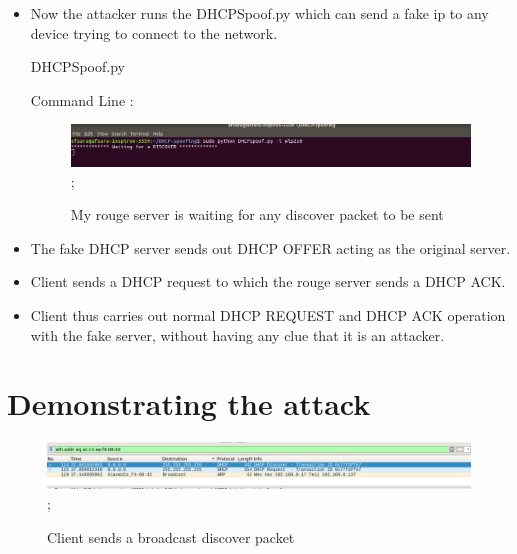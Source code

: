 \documentclass[12pt]{article}
\begin{document}
\begin{sloppypar}
\begin{itemize}
    \item Now the attacker runs the DHCPSpoof.py which can send a fake ip to any device trying to connect to the network.
    
    \newpage
    DHCPSpoof.py
    

    Command Line : 
    

    \begin{figure}[h]
    \centering
    \includegraphics[width=15 cm,height=2 cm]{images/runningDHCPSpoof1.png};
    \caption{My rouge server is waiting for any discover packet to be sent}
    \end{figure}
    
     \item The fake DHCP server sends out DHCP OFFER acting as the original server.
     
     \item Client sends a DHCP request to which the rouge server sends a DHCP ACK.
     
     \item Client thus carries out normal DHCP REQUEST and DHCP ACK operation with the fake server, without having any clue that it is an attacker.
    
    \end{itemize}
    \newpage    
    \section{Demonstrating the attack}

    \begin{figure}[h]
    \centering
    \includegraphics[width=15 cm,height= 3 cm]{images/discover1-1.png};
    \caption{Client sends a broadcast discover packet}
    \end{figure}
    

\end{sloppypar}
\end{document}
